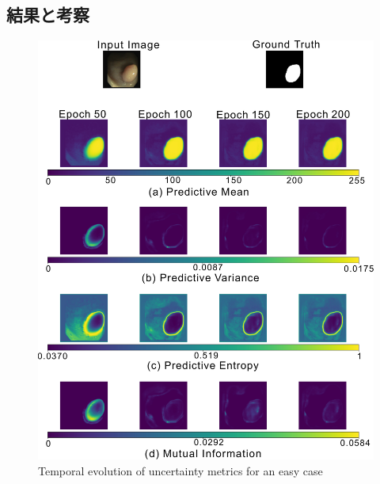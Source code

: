 \documentclass[10pt, a4paper, twocolumn]{jarticle}
\begin{document}
\subsection{結果と考察}

\begin{figure}[t] %
  \begin{center}
    \includegraphics[width=\hsize]{figure/fold5_file144_uncertainty_evolution.pdf}
    \caption{Temporal evolution of uncertainty metrics for an easy case}
    \label{fold5_file144}
  \end{center}
\end{figure}
\end{document}
